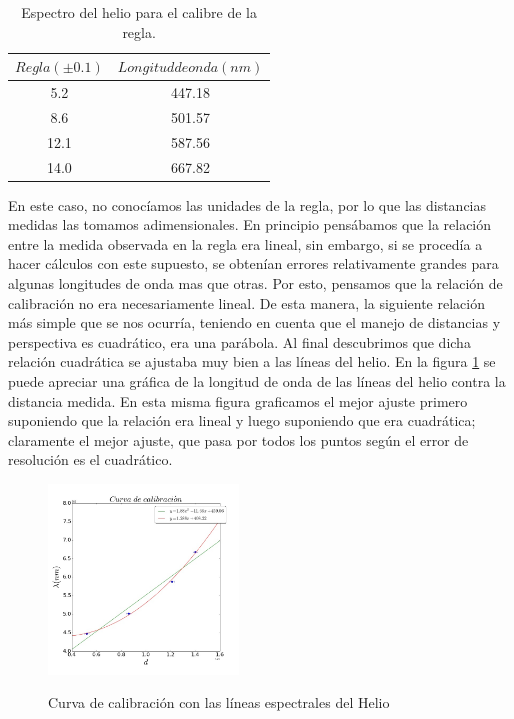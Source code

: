 \documentclass[%
 reprint,
 amsmath,amssymb,
 aps,
]{revtex4-1}
\begin{document}
\begin{table}[h!]
\centering
 \begin{tabular}{|c|c|} 
 \hline
 $Regla (\pm0.1)$ & $Longitud de onda (nm)$ \\ [0.5ex] 
 \hline\hline
5.2 &		447.18\\
8.6 &		501.57\\
12.1 &		587.56\\
14.0 &		667.82\\
[1ex] 
 \hline
 \end{tabular}
 \caption{Espectro del helio para el calibre de la regla.}
 \label{table:helio}
\end{table}

En este caso, no conocíamos las unidades de la regla, por lo que las distancias medidas las tomamos adimensionales. En principio pensábamos que la relación entre la medida observada en la regla era lineal, sin embargo, si se procedía a hacer cálculos con este supuesto, se obtenían errores relativamente grandes para algunas longitudes de onda mas que otras. Por esto, pensamos que la relación de calibración no era necesariamente lineal. De esta manera, la siguiente relación más simple que se nos ocurría, teniendo en cuenta que el manejo de distancias y perspectiva es cuadrático, era una parábola. Al final descubrimos que dicha relación cuadrática se ajustaba muy bien a las líneas del helio. En la figura \ref{fig:calibre} se puede apreciar una gráfica de la longitud de onda de las líneas del helio contra la distancia medida. En esta misma figura graficamos el mejor ajuste primero suponiendo que la relación era lineal y luego suponiendo que era cuadrática; claramente el mejor ajuste, que pasa por todos los puntos según el error de resolución es el cuadrático.\\

\begin{figure}[h]
\caption{Curva de calibración con las líneas espectrales del Helio}
\centering
\includegraphics[width=0.45\textwidth]{calibre}
\label{fig:calibre}
\end{figure}
\end{document}
